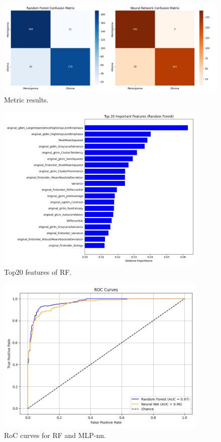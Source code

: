 \documentclass[11pt,a4paper]{report}
\begin{document}
		\begin{figure}[h]
			\centering
			\includegraphics[width=1.1\textwidth]{images/classification_pyradiomics.png}
			\caption{Metric results.}
			\label{fig1:}
		\end{figure}		

		\begin{figure}[h]
			\centering
			\includegraphics[width=0.9\textwidth]{images/top20_rf_pyradiomics.png}
			\caption{Top20 features of RF.}
			\label{fig1:}
		\end{figure}		

		\begin{figure}[H]
			\centering
			\includegraphics[width=0.9\textwidth]{images/roc_pyradiomics.png}
			\caption{RoC curves for RF and MLP-nn.}
			\label{fig1:}
		\end{figure}		
\end{document}
